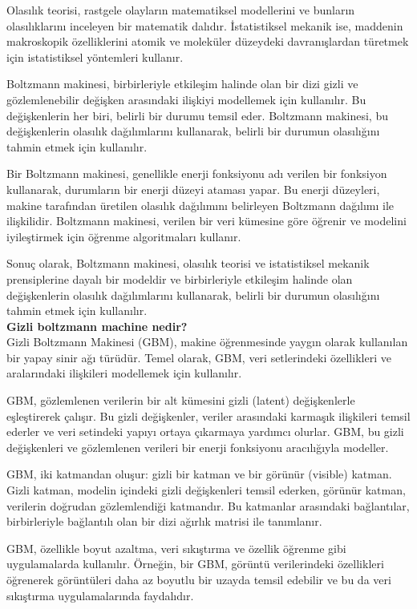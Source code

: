 \documentclass[11pt]{article}
\begin{document}
Olasılık teorisi, rastgele olayların matematiksel modellerini ve bunların olasılıklarını inceleyen bir matematik dalıdır. İstatistiksel mekanik ise, maddenin makroskopik özelliklerini atomik ve moleküler düzeydeki davranışlardan türetmek için istatistiksel yöntemleri kullanır.

Boltzmann makinesi, birbirleriyle etkileşim halinde olan bir dizi gizli ve gözlemlenebilir değişken arasındaki ilişkiyi modellemek için kullanılır. Bu değişkenlerin her biri, belirli bir durumu temsil eder. Boltzmann makinesi, bu değişkenlerin olasılık dağılımlarını kullanarak, belirli bir durumun olasılığını tahmin etmek için kullanılır.

Bir Boltzmann makinesi, genellikle enerji fonksiyonu adı verilen bir fonksiyon kullanarak, durumların bir enerji düzeyi ataması yapar. Bu enerji düzeyleri, makine tarafından üretilen olasılık dağılımını belirleyen Boltzmann dağılımı ile ilişkilidir. Boltzmann makinesi, verilen bir veri kümesine göre öğrenir ve modelini iyileştirmek için öğrenme algoritmaları kullanır.

Sonuç olarak, Boltzmann makinesi, olasılık teorisi ve istatistiksel mekanik prensiplerine dayalı bir modeldir ve birbirleriyle etkileşim halinde olan değişkenlerin olasılık dağılımlarını kullanarak, belirli bir durumun olasılığını tahmin etmek için kullanılır.\\
\textbf{Gizli boltzmann machine nedir?}\\
Gizli Boltzmann Makinesi (GBM), makine öğrenmesinde yaygın olarak kullanılan bir yapay sinir ağı türüdür. Temel olarak, GBM, veri setlerindeki özellikleri ve aralarındaki ilişkileri modellemek için kullanılır.

GBM, gözlemlenen verilerin bir alt kümesini gizli (latent) değişkenlerle eşleştirerek çalışır. Bu gizli değişkenler, veriler arasındaki karmaşık ilişkileri temsil ederler ve veri setindeki yapıyı ortaya çıkarmaya yardımcı olurlar. GBM, bu gizli değişkenleri ve gözlemlenen verileri bir enerji fonksiyonu aracılığıyla modeller.

GBM, iki katmandan oluşur: gizli bir katman ve bir görünür (visible) katman. Gizli katman, modelin içindeki gizli değişkenleri temsil ederken, görünür katman, verilerin doğrudan gözlemlendiği katmandır. Bu katmanlar arasındaki bağlantılar, birbirleriyle bağlantılı olan bir dizi ağırlık matrisi ile tanımlanır.

GBM, özellikle boyut azaltma, veri sıkıştırma ve özellik öğrenme gibi uygulamalarda kullanılır. Örneğin, bir GBM, görüntü verilerindeki özellikleri öğrenerek görüntüleri daha az boyutlu bir uzayda temsil edebilir ve bu da veri sıkıştırma uygulamalarında faydalıdır.
\end{document}
